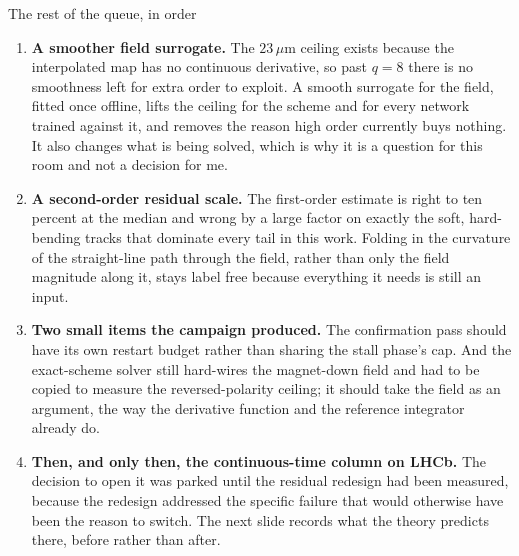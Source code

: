 \documentclass[aspectratio=169,10pt]{beamer}
\newcommand{\um}{\ensuremath{\,\mu\mathrm{m}}}
\newcommand{\hl}[1]{{\color{accent}\textbf{#1}}}
\begin{document}
\begin{frame}[shrink=25]{The rest of the queue, in order}
  \vspace{2mm}
  \begin{enumerate}\setlength{\itemsep}{7pt}
    \item \hl{A smoother field surrogate.} The $23\um$ ceiling exists because
      the interpolated map has no continuous derivative, so past $q = 8$ there
      is no smoothness left for extra order to exploit. A smooth surrogate for
      the field, fitted once offline, lifts the ceiling for the scheme and for
      every network trained against it, and removes the reason high order
      currently buys nothing. It also changes what is being solved, which is why
      it is a question for this room and not a decision for me.
    \item \hl{A second-order residual scale.} The first-order estimate is right
      to ten percent at the median and wrong by a large factor on exactly the
      soft, hard-bending tracks that dominate every tail in this work. Folding
      in the curvature of the straight-line path through the field, rather than
      only the field magnitude along it, stays label free because everything it
      needs is still an input.
    \item \hl{Two small items the campaign produced.} The confirmation pass
      should have its own restart budget rather than sharing the stall phase's
      cap. And the exact-scheme solver still hard-wires the magnet-down field
      and had to be copied to measure the reversed-polarity ceiling; it should
      take the field as an argument, the way the derivative function and the
      reference integrator already do.
    \item \hl{Then, and only then, the continuous-time column on LHCb.} The
      decision to open it was parked until the residual redesign had been
      measured, because the redesign addressed the specific failure that would
      otherwise have been the reason to switch. The next slide records what the
      theory predicts there, before rather than after.
  \end{enumerate}
\end{frame}
\end{document}
